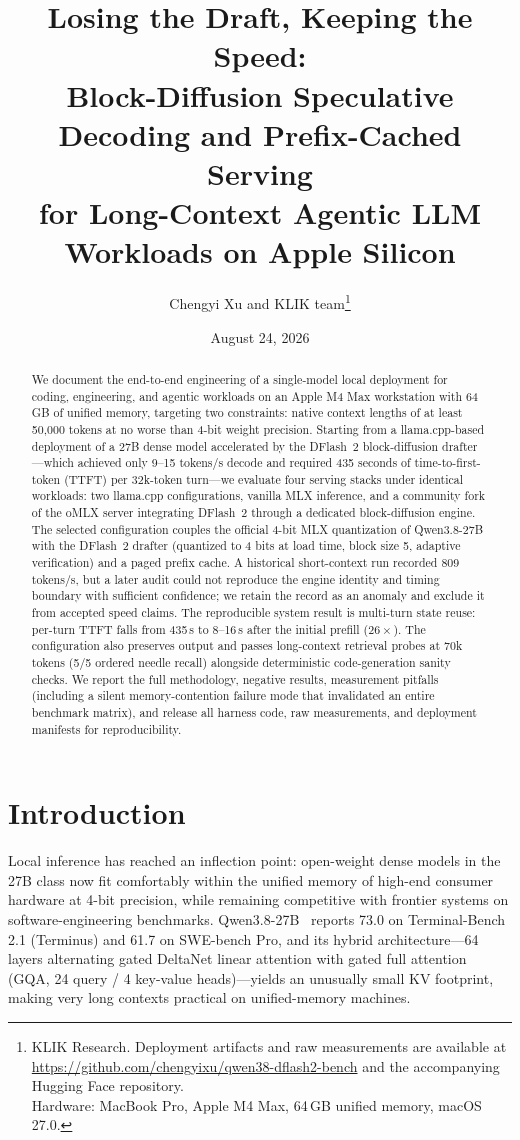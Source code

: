 \documentclass[11pt]{article}
\title{\textbf{Losing the Draft, Keeping the Speed:\\ Block-Diffusion Speculative Decoding and Prefix-Cached Serving\\ for Long-Context Agentic LLM Workloads on Apple Silicon}}
\author{Chengyi Xu and KLIK team\thanks{KLIK Research. Deployment artifacts and raw measurements are available at\\
\url{https://github.com/chengyixu/qwen38-dflash2-bench} and the accompanying Hugging Face repository.\\
Hardware: MacBook Pro, Apple M4 Max, 64\,GB unified memory, macOS 27.0.}}
\date{August 24, 2026}
\newcommand{\dflash}{DFlash~2}
\newcommand{\omlx}{oMLX}
\begin{document}
\maketitle

\begin{abstract}
We document the end-to-end engineering of a single-model local deployment for
coding, engineering, and agentic workloads on an Apple M4 Max workstation with
64\,GB of unified memory, targeting two constraints: native context lengths of
at least 50{,}000 tokens at no worse than 4-bit weight precision. Starting from
a llama.cpp-based deployment of a 27B dense model accelerated by the \dflash{}
block-diffusion drafter---which achieved only 9--15 tokens/s decode and required
435 seconds of time-to-first-token (TTFT) per 32k-token turn---we evaluate four
serving stacks under identical workloads: two llama.cpp configurations, vanilla
MLX inference, and a community fork of the \omlx{} server integrating \dflash{}
through a dedicated block-diffusion engine. The selected configuration couples
the official 4-bit MLX quantization of Qwen3.8-27B with the \dflash{} drafter
(quantized to 4 bits at load time, block size 5, adaptive verification) and a
paged prefix cache. A historical short-context run recorded 809 tokens/s, but a
later audit could not reproduce the engine identity and timing boundary with
sufficient confidence; we retain the record as an anomaly and exclude it from
accepted speed claims. The reproducible system result is multi-turn state reuse:
per-turn TTFT falls from 435\,s to 8--16\,s after the initial prefill
($26\times$). The configuration also preserves output and passes long-context
retrieval probes at 70k tokens (5/5 ordered needle recall) alongside deterministic
code-generation sanity checks. We report the full methodology, negative results,
measurement pitfalls (including a silent memory-contention failure mode that
invalidated an entire benchmark matrix), and release all harness code, raw
measurements, and deployment manifests for reproducibility.
\end{abstract}

\section{Introduction}
Local inference has reached an inflection point: open-weight dense models in the
27B class now fit comfortably within the unified memory of high-end consumer
hardware at 4-bit precision, while remaining competitive with frontier systems
on software-engineering benchmarks. Qwen3.8-27B~\cite{qwen38} reports
73.0 on Terminal-Bench 2.1 (Terminus) and 61.7 on SWE-bench Pro, and its hybrid
architecture---64 layers alternating gated DeltaNet linear attention with gated
full attention (GQA, 24 query / 4 key-value heads)---yields an unusually small
KV footprint, making very long contexts practical on unified-memory machines.
\end{document}
